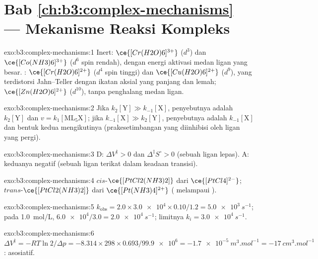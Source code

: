 \section*{Bab \ref{ch:b3:complex-mechanisms} --- Mekanisme Reaksi Kompleks}

\begin{solution}{exo:b3:complex-mechanisms:1}
Inert: $\ce{[Cr(H2O)6]^{3+}}$ ($d^3$) dan $\ce{[Co(NH3)6]^{3+}}$ ($d^6$ spin rendah), dengan energi aktivasi medan ligan
yang besar. : $\ce{[Cr(H2O)6]^{2+}}$ ($d^4$ spin tinggi) dan $\ce{[Cu(H2O)6]^{2+}}$ ($d^9$),
yang terdistorsi Jahn--Teller dengan ikatan aksial yang panjang dan lemah; $\ce{[Zn(H2O)6]^{2+}}$ ($d^{10}$), tanpa penghalang
medan ligan.
\end{solution}

\begin{solution}{exo:b3:complex-mechanisms:2}
Jika $k_2[\mathrm Y] \gg k_{-1}[\mathrm X]$, penyebutnya adalah $k_2[\mathrm Y]$ dan $v = k_1[\mathrm{ML_5X}]$; jika $k_{-1}[\mathrm X] \gg k_2[\mathrm Y]$, penyebutnya adalah
$k_{-1}[\mathrm X]$ dan bentuk kedua mengikutinya (prakesetimbangan yang diinhibisi oleh ligan
yang pergi).
\end{solution}

\begin{solution}{exo:b3:complex-mechanisms:3}
D: $\Delta V^{\ddagger} > 0$ dan $\Delta^{\ddagger}S^\circ > 0$ (sebuah ligan lepas). A: keduanya negatif (sebuah ligan terikat dalam
keadaan transisi).
\end{solution}

\begin{solution}{exo:b3:complex-mechanisms:4}
$cis$-$\ce{[PtCl2(NH3)2]}$ dari $\ce{[PtCl4]^{2-}}$; $trans$-$\ce{[PtCl2(NH3)2]}$ dari $\ce{[Pt(NH3)4]^{2+}}$ (  melampaui  ).
\end{solution}

\begin{solution}{exo:b3:complex-mechanisms:5}
$k_{\mathrm{obs}} = 2.0 \times \num{3.0e4} \times 0.10/1.2 = \qty{5.0e3}{s^{-1}}$; pada \qty{1.0}{mol/L}, $\num{6.0e4}/3.0 = \qty{2.0e4}{s^{-1}}$; limitnya
$k_i = \qty{3.0e4}{s^{-1}}$.
\end{solution}

\begin{solution}{exo:b3:complex-mechanisms:6}
$\Delta V^{\ddagger} = -RT\ln2/\Delta p = -8.314 \times 298 \times 0.693/\num{99.9e6} = \qty{-1.7e-5}{m^3.mol^{-1}} = \qty{-17}{cm^3.mol^{-1}}$:
asosiatif.
\end{solution}

